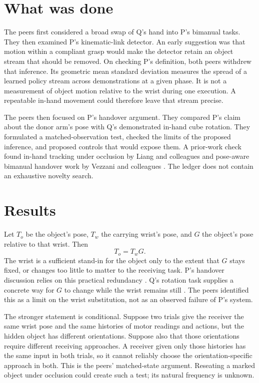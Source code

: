 \documentclass{article}
\begin{document}
\section{What was done}

The peers first considered a broad swap of Q's hand into P's bimanual tasks. They then examined P's
kinematic-link detector. An early suggestion was that motion within a compliant grasp would make the
detector retain an object stream that should be removed. On checking P's definition, both peers
withdrew that inference. Its geometric mean standard deviation measures the spread of a learned
policy stream across demonstrations at a given phase. It is not a measurement of object motion
relative to the wrist during one execution. A repeatable in-hand movement could therefore leave that
stream precise.

The peers then focused on P's handover argument. They compared P's claim about the donor arm's pose
with Q's demonstrated in-hand cube rotation. They formulated a matched-observation test, checked the
limits of the proposed inference, and proposed controls that would expose them. A prior-work check
found in-hand tracking under occlusion by Liang and colleagues \cite{liang2020} and pose-aware
bimanual handover work by Vezzani and colleagues \cite{vezzani2017}. The ledger does not contain an
exhaustive novelty search.

\section{Results}

Let \(T_o\) be the object's pose, \(T_w\) the carrying wrist's pose, and \(G\) the object's pose relative to that wrist. Then
\[
T_o = T_w G.
\]
The wrist is a sufficient stand-in for the object only to the extent that \(G\) stays fixed, or
changes too little to matter to the receiving task. P's handover discussion relies on this practical
redundancy \cite{p}. Q's rotation task supplies a concrete way for \(G\) to change while the wrist
remains still \cite{q}. The peers identified this as a limit on the wrist substitution, not as an
observed failure of P's system.

The stronger statement is conditional. Suppose two trials give the receiver the same wrist pose and
the same histories of motor readings and actions, but the hidden object has different orientations.
Suppose also that those orientations require different receiving approaches. A receiver given only
those histories has the same input in both trials, so it cannot reliably choose the
orientation-specific approach in both. This is the peers' matched-state argument. Reseating a marked
object under occlusion could create such a test; its natural frequency is unknown.
\end{document}
